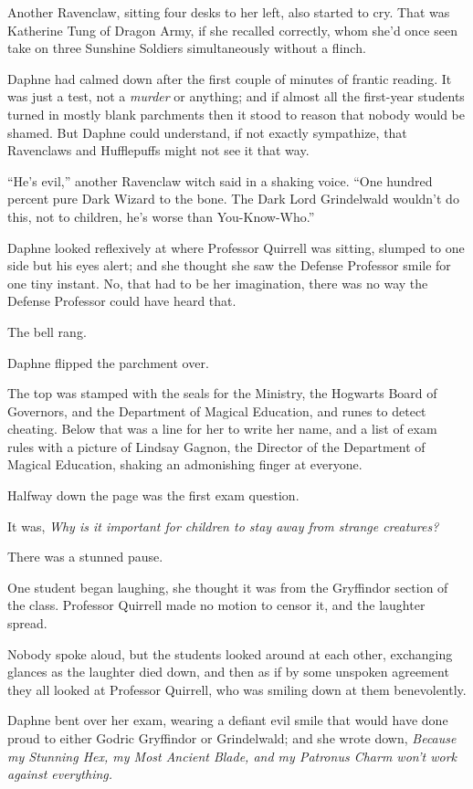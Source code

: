 Another Ravenclaw, sitting four desks to her left, also started to cry.
That was Katherine Tung of Dragon Army, if she recalled correctly, whom
she'd once seen take on three Sunshine Soldiers simultaneously without a
flinch.

Daphne had calmed down after the first couple of minutes of frantic
reading. It was just a test, not a \emph{murder} or anything; and if
almost all the first-year students turned in mostly blank parchments
then it stood to reason that nobody would be shamed. But Daphne could
understand, if not exactly sympathize, that Ravenclaws and Hufflepuffs
might not see it that way.

``He's evil,'' another Ravenclaw witch said in a shaking voice. ``One
hundred percent pure Dark Wizard to the bone. The Dark Lord Grindelwald
wouldn't do this, not to children, he's worse than You-Know-Who.''

Daphne looked reflexively at where Professor Quirrell was sitting,
slumped to one side but his eyes alert; and she thought she saw the
Defense Professor smile for one tiny instant. No, that had to be her
imagination, there was no way the Defense Professor could have heard
that.

The bell rang.

Daphne flipped the parchment over.

The top was stamped with the seals for the Ministry, the Hogwarts Board
of Governors, and the Department of Magical Education, and runes to
detect cheating. Below that was a line for her to write her name, and a
list of exam rules with a picture of Lindsay Gagnon, the Director of the
Department of Magical Education, shaking an admonishing finger at
everyone.

Halfway down the page was the first exam question.

It was, \emph{Why is it important for children to stay away from strange
creatures?}

There was a stunned pause.

One student began laughing, she thought it was from the Gryffindor
section of the class. Professor Quirrell made no motion to censor it,
and the laughter spread.

Nobody spoke aloud, but the students looked around at each other,
exchanging glances as the laughter died down, and then as if by some
unspoken agreement they all looked at Professor Quirrell, who was
smiling down at them benevolently.

Daphne bent over her exam, wearing a defiant evil smile that would have
done proud to either Godric Gryffindor or Grindelwald; and she wrote
down, \emph{Because my Stunning Hex, my Most Ancient Blade, and my
Patronus Charm won't work against everything.}

